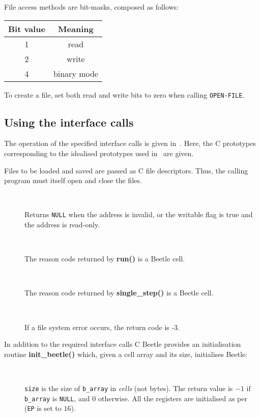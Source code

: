 \documentclass[english]{article}
\newlength{\ifacewidth}\ifacewidth=\textwidth \advance\ifacewidth by -0.1in
\newlength{\innerwidth}\innerwidth=\ifacewidth \advance\innerwidth by -0.5in
\newcommand{\ifacec}[2]{\item[]\parbox{\ifacewidth}{\hspace*{2.5mm}{\tt #1}\\[0.5ex]\hspace*{0.4in}\parbox{\innerwidth}{#2}}}
\begin{document}
File access methods are bit-masks, composed as follows:

\begin{center}
\begin{tabular}{cc} \toprule
\rule[-2mm]{0mm}{6mm}\bf Bit value & \bf Meaning \\ \midrule
1 & read \\
2 & write \\
4 & binary mode \\ \bottomrule
\end{tabular}
\end{center}

To create a file, set both read and write bits to zero when calling {\tt OPEN-FILE}.


\subsection{Using the interface calls}
\label{usingcalls}

The operation of the specified interface calls is given in~\cite{beetle}. Here, the C prototypes corresponding to the idealised prototypes used in~\cite{beetle} are given.

Files to be loaded and saved are passed as C file descriptors. Thus, the
calling program must itself open and close the files.

\begin{description}
\ifacec{uint8\_t *native\_address(UCELL address, bool writable)}{Returns {\tt NULL} when the address is invalid, or the writable flag is true and the address is read-only.}
\ifacec{CELL run(void)}{The reason code returned by {\bf run()} is a Beetle
cell.}
\ifacec{CELL single\_step(void)}{The reason code returned by {\bf single\_step()}
is a Beetle cell.}
\ifacec{int load\_object(FILE *file, UCELL address)}{If a file system error
occurs, the return code is -3.}
\end{description}

In addition to the required interface calls C Beetle provides an initialisation routine {\bf init\_beetle()} which, given a cell array and its size, initialises Beetle:

\begin{description}
\ifacec{int init\_beetle(CELL *b\_array, long size)}{{\tt size} is
the size of {\tt b\_array} in {\em cells} (not bytes). The return value is $-1$ if {\tt b\_array} is {\tt NULL}, and $0$ otherwise.
All the registers are initialised as per~\cite{beetle} ({\tt EP} is set to $16$).}
\end{description}
\end{document}
